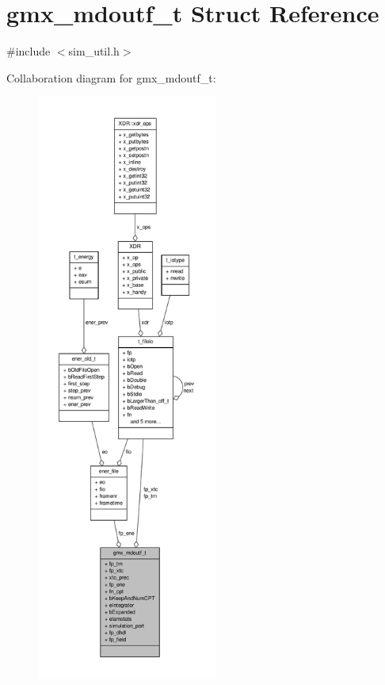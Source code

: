 \hypertarget{structgmx__mdoutf__t}{\section{gmx\-\_\-mdoutf\-\_\-t \-Struct \-Reference}
\label{structgmx__mdoutf__t}
}


{\ttfamily \#include $<$sim\-\_\-util.\-h$>$}



\-Collaboration diagram for gmx\-\_\-mdoutf\-\_\-t\-:
\nopagebreak
\begin{figure}[H]
\begin{center}
\leavevmode
\includegraphics[height=550pt]{structgmx__mdoutf__t__coll__graph}
\end{center}
\end{figure}
